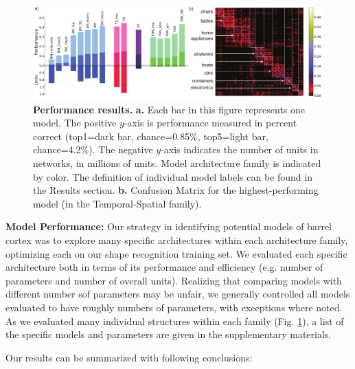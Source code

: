 \begin{figure}
\includegraphics [width=1\linewidth]{figures/results.pdf}
\vspace{-2mm}
\caption{\textbf{Performance results.} \textbf{a.} Each bar in this figure represents one model. The positive $y$-axis is performance measured in percent correct (top1=dark bar, chance=0.85\%, top5=light bar, chance=4.2\%).   The negative $y$-axis indicates the number of units in networks, in millions of units.  Model architecture family is indicated by color.  The definition of individual model labels can be found in the Results section. \textbf{b.} Confusion Matrix for the highest-performing model (in the Temporal-Spatial family).~\label{fig_main}}
\end{figure}

\textbf{Model Performance:} Our strategy in identifying potential models of barrel cortex was to explore many specific architectures within each architecture family, optimizing each on our shape recognition training set.  We evaluated each specific architecture both in terms of its performance and efficiency (e.g. number of parameters and number of overall units). 
Realizing that comparing models with different number sof parameters may be unfair, we generally controlled all models evaluated to have roughly numbers of parameters, with exceptions where noted.  
As we evaluated many individual structures within each family (Fig. \ref{fig_main}), a list of the specific models and parameters are given in the supplementary materials. 

Our results can be summarized with following conclusions:

